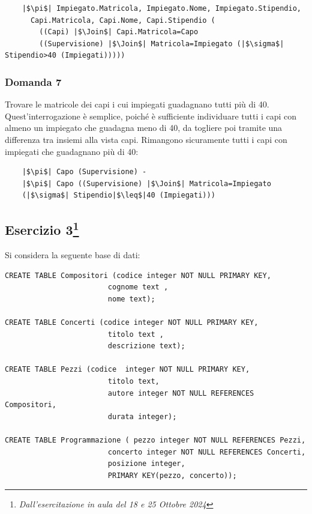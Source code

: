 \documentclass{article}
\begin{document}
\begin{verbatim}
    |$\pi$| Impiegato.Matricola, Impiegato.Nome, Impiegato.Stipendio, 
      Capi.Matricola, Capi.Nome, Capi.Stipendio (
        ((Capi) |$\Join$| Capi.Matricola=Capo
        ((Supervisione) |$\Join$| Matricola=Impiegato (|$\sigma$| Stipendio>40 (Impiegati)))))
\end{verbatim}

\subsubsection*{Domanda 7}

Trovare le matricole dei capi i cui impiegati guadagnano tutti più di 40. Quest'interrogazione è semplice, poiché è sufficiente individuare tutti i capi con almeno un impiegato che guadagna meno di 40, da togliere poi 
tramite una differenza tra insiemi alla vista capi. Rimangono sicuramente tutti i capi con impiegati che guadagnano più di 40:
\begin{verbatim}
    |$\pi$| Capo (Supervisione) -
    |$\pi$| Capo ((Supervisione) |$\Join$| Matricola=Impiegato
    (|$\sigma$| Stipendio|$\leq$|40 (Impiegati)))

\end{verbatim}

\subsection{Esercizio 3\footnote{\textit{Dall'esercitazione in aula del 18 e 25 Ottobre 2024}}}

Si considera la seguente base di dati:
\begin{verbatim}
CREATE TABLE Compositori (codice integer NOT NULL PRIMARY KEY,
                        cognome text ,
                        nome text);
						
CREATE TABLE Concerti (codice integer NOT NULL PRIMARY KEY,
                        titolo text ,
                        descrizione text);

CREATE TABLE Pezzi (codice  integer NOT NULL PRIMARY KEY,
                        titolo text,
                        autore integer NOT NULL REFERENCES Compositori,
                        durata integer);

CREATE TABLE Programmazione ( pezzo integer NOT NULL REFERENCES Pezzi,
                        concerto integer NOT NULL REFERENCES Concerti, 
                        posizione integer,
                        PRIMARY KEY(pezzo, concerto));

\end{verbatim}
\end{document}
